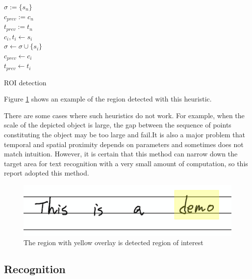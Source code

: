 \begin{algorithm}
\DontPrintSemicolon
    $\sigma := \{s_n\}$ \\
    $c_{prev} := c_n$ \\
    $t_{prev} := t_n$ \\
    {
        $c_i, t_i \leftarrow s_i$\\
        {
            $\sigma\leftarrow \sigma \cup \{s_i\}$ \\

        } 
        $c_{prev} \leftarrow c_i$ \\
        $t_{prev} \leftarrow t_i$
    }
\caption{ROI detection}
\label{alg:roi}
\end{algorithm}

Figure \ref{fig:region_of_interest} shows an example of the region detected with
this heuristic.

There are some cases where such heuristics do not work. For example, when the scale of
the depicted object is large, the gap between the sequence of points
constituting the object may be too large and fail.It is also a major problem that
temporal and spatial proximity depends on parameters and sometimes does not match intuition.
However, it is certain that this method can narrow down the target area for text recognition
with a very small amount of computation, so this report adopted this method.

\begin{figure}
    \centering
    \includegraphics[width=\linewidth]{images/region_of_interest.png}
    \caption{The region with yellow overlay is detected region of interest}
    \label{fig:region_of_interest}
\end{figure}

\subsection{Recognition}

